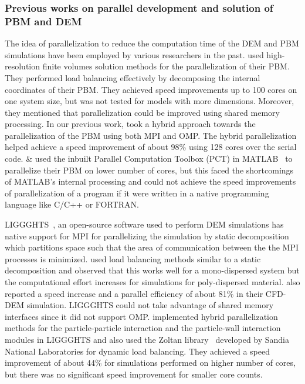 \documentclass[preprint,11pt,authoryear]{elsarticle}
\begin{document}
\subsubsection{Previous works on parallel development and solution of PBM and DEM}
The idea of parallelization to reduce the computation time of the DEM and PBM simulations have 
been employed by various researchers in the past. \cite{Gunawan2008} used high-resolution 
finite volumes solution methods for the parallelization of their PBM. They performed load 
balancing effectively by decomposing the internal coordinates of their PBM. They achieved 
speed improvements up to 100 cores on one system size, but was not tested for models 
with more dimensions. Moreover, they mentioned that parallelization could be 
improved using shared memory processing. 
In our previous work, \cite{Bettencourt2017} took a 
hybrid approach towards the parallelization of the PBM using both MPI and OMP. 
The hybrid parallelization helped achieve a speed improvement of about 98\% using 
128 cores over the serial code. 
\cite{Prakash2013a} \& \cite{Prakash2013b} used the inbuilt Parallel Computation 
Toolbox (PCT) in MATLAB~\citep{pctMatlab} to parallelize their PBM on lower number 
of cores, but this faced the shortcomings of MATLAB's internal processing and 
could not achieve the speed improvements of parallelization of a program if 
it were written in a native programming language like C/C++ or FORTRAN. 

LIGGGHTS~\citep{Kloss2012}, an open-source software used to perform DEM simulations has native 
support for MPI for parallelizing the simulation by static decomposition which partitions space such that 
the area of communication between the the MPI processes is minimized. \cite{kacianauskas2010} used 
load balancing methods similar to a static decomposition and observed that this works well for a 
mono-dispersed system but the computational effort increases for simulations for poly-dispersed 
material. \cite{Gopalakrishnan2013} also reported a speed increase and a parallel efficiency of about 
81\% in their CFD-DEM simulation. LIGGGHTS could not take advantage of shared memory interfaces 
since it did not support OMP. \cite{Berger2015} implemented hybrid parallelization methods for the 
particle-particle interaction and the particle-wall interaction modules in LIGGGHTS and also used the 
Zoltan library~\citep{Boman2012} developed by Sandia National Laboratories for dynamic load 
balancing. They achieved a speed improvement of about 44\% for simulations performed on higher 
number of cores, but there was no significant speed improvement for smaller core counts. 
\end{document}
